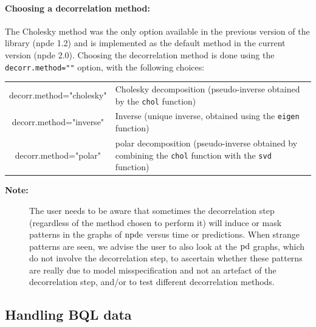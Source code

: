 \paragraph{Choosing a decorrelation method:} The Cholesky method was the only option available in the previous 
version of the library (npde 1.2) and is implemented as the default method in the current version (npde 2.0). 
Choosing the decorrelation method is done using the \texttt{decorr.method=""} option, with the following choices: 
\begin{center} 
\begin{tabular}{c p{11cm}} 
\hline decorr.method="cholesky" & Cholesky decomposition (pseudo-inverse  obtained by the \texttt{chol} function)\\ 
decorr.method="inverse" & Inverse (unique inverse, obtained using the \texttt{eigen} function)\\
decorr.method="polar" & polar decomposition (pseudo-inverse obtained by combining the \texttt{chol} function with the \texttt{svd} function)\\ 
\hline 
\end{tabular} 
\end{center} 
\begin{description} 
\item[{\bf Note:}] The user needs to be aware that sometimes the decorrelation step (regardless of the method 
chosen to perform it) will induce or mask patterns in the graphs of ${\rm npde}$ versus time or predictions. When 
strange patterns are seen, we advise the user to also look at the ${\rm pd}$ graphs, which do not involve the 
decorrelation step, to ascertain whether these patterns are really due to model misspecification and not an 
artefact of the decorrelation step, and/or to test different decorrelation methods. 
\end{description}

\subsection{Handling BQL data} \label{sec:npdeBQL}

